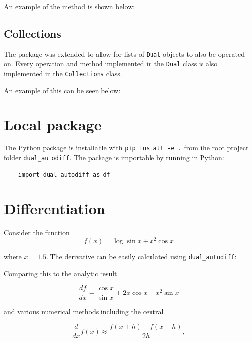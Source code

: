 \documentclass[11pt,a4paper]{article}
\begin{document}
An example of the method is shown below:
\subsection{Collections}
The package was extended to allow for lists of \texttt{Dual} objects to also be operated on. Every operation and method implemented in the \texttt{Dual} class is also implemented in the \texttt{Collections} class. 

An example of this can be seen below:
\begin{landscape}
\end{landscape}

\section{Local package}
The Python package is installable with \texttt{pip install -e .} from the root project folder \texttt{dual\_autodiff}. The package is importable by running in Python:

\begin{lstlisting}
    import dual_autodiff as df
\end{lstlisting}

\section{Differentiation}
Consider the function
\begin{equation}
    f(x) = \log{\sin{x}} + x^2 \cos{x}
    \label{eq:func}
\end{equation}

where $x=1.5$. The derivative can be easily calculated using \texttt{dual\_autodiff}:

Comparing this to the analytic result

\begin{equation}
    \frac{df}{dx} = \frac{\cos{x}}{\sin{x}} + 2 x \cos{x} - x^2 \sin{x} 
\end{equation}

and various numerical methods including the central

\begin{equation}
    \frac{d}{dx} f(x) \approx \frac{f(x+h) - f(x-h)}{2h},
\end{equation}
\end{document}
